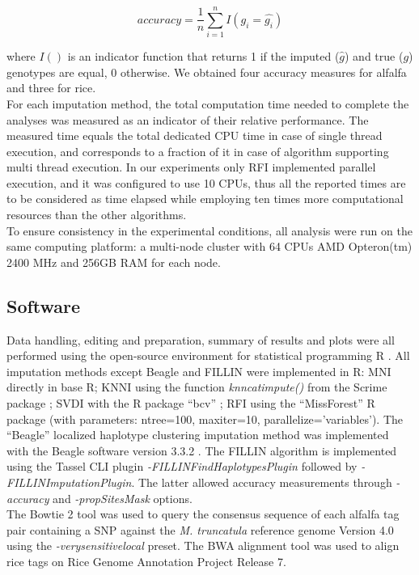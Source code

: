 \begin{equation}
\label{eq:accuracy}
accuracy = \frac{1}{n} \sum_{i=1}^{n}{I(g_i = \hat{g_i})}
\end{equation}

where $I()$ is an indicator function that returns 1 if the imputed ($\hat{g}$) and true ($g$) genotypes are equal, 0 otherwise. We obtained four accuracy measures for alfalfa and three for rice.\\
For each imputation method, the total computation time needed to complete the analyses was measured as an indicator of their relative performance. The measured time equals the total dedicated CPU time in case of single thread execution, and corresponds to a fraction of it in case of algorithm supporting multi thread execution. In our experiments only RFI implemented parallel execution, and it was configured to use 10 CPUs, thus all the reported times are to be considered as time elapsed while employing ten times more computational resources than the other algorithms.\\
To ensure consistency in the experimental conditions, all analysis were run on the same computing platform: a multi-node cluster with 64 CPUs AMD Opteron(tm) 2400 MHz and 256GB RAM for each node.
 
\subsection{Software}
\label{sec:software}
Data handling, editing and preparation, summary of results and plots were all performed using the open-source environment for statistical programming R \cite{r_core_team_r:_2014}. All imputation methods except Beagle and FILLIN were implemented in R: MNI directly in base R; KNNI using the function \emph{knncatimpute()} from the Scrime package \cite{schwender_scrime:_2013}; SVDI with the R package ``bcv'' \cite{perry_bcv:_2009}; RFI using the ``MissForest'' \cite{stekhoven_missforestnon-parametric_2012} R package (with parameters: ntree=100, maxiter=10, parallelize='variables'). The ``Beagle'' localized haplotype clustering imputation method was implemented with the Beagle software version 3.3.2 \cite{browning_rapid_2007}. The FILLIN algorithm is implemented using the Tassel CLI plugin \emph{-FILLINFindHaplotypesPlugin} followed by \emph{-FILLINImputationPlugin}. The latter allowed accuracy measurements through \emph{-accuracy} and \emph{-propSitesMask} options.\\
The Bowtie 2 tool \cite{langmead_fast_2012} was used to query the consensus sequence of each alfalfa tag pair containing a SNP against the \emph{M. truncatula} reference genome Version 4.0 using the \emph{-verysensitivelocal} preset. The BWA alignment tool \cite{li2009fast} was used to align rice tags on Rice Genome Annotation Project Release 7.

